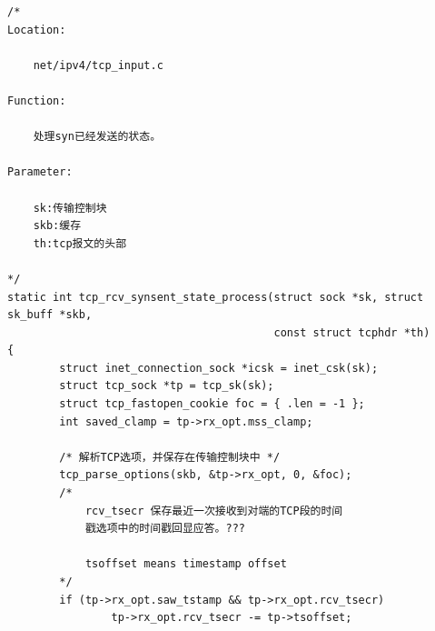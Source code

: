 \begin{verbatim}
/*
Location:

    net/ipv4/tcp_input.c

Function:

    处理syn已经发送的状态。

Parameter:

    sk:传输控制块
    skb:缓存
    th:tcp报文的头部

*/
static int tcp_rcv_synsent_state_process(struct sock *sk, struct sk_buff *skb,
                                         const struct tcphdr *th)
{
        struct inet_connection_sock *icsk = inet_csk(sk);
        struct tcp_sock *tp = tcp_sk(sk);
        struct tcp_fastopen_cookie foc = { .len = -1 };
        int saved_clamp = tp->rx_opt.mss_clamp;

        /* 解析TCP选项，并保存在传输控制块中 */
        tcp_parse_options(skb, &tp->rx_opt, 0, &foc);
        /*
            rcv_tsecr 保存最近一次接收到对端的TCP段的时间
            戳选项中的时间戳回显应答。???

            tsoffset means timestamp offset
        */
        if (tp->rx_opt.saw_tstamp && tp->rx_opt.rcv_tsecr)
                tp->rx_opt.rcv_tsecr -= tp->tsoffset;
\end{verbatim}

